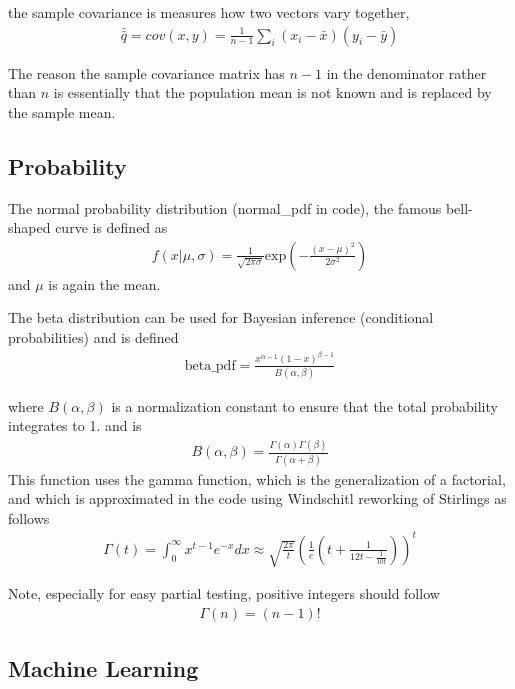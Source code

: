 \documentclass[jcp,aip,amsmath]{revtex4-1}
\begin{document}
the sample covariance is measures how two vectors vary together,
\begin{align}
\bar{\bar{q}}= cov(x,y) = \frac{1}{n-1} \sum_i (x_i - \bar{x}) (y_i - \bar{y})
\end{align}

The reason the sample covariance matrix has $n-1$ in the denominator rather than $n$ is essentially that the population mean is not known and is replaced by the sample mean.




\subsection{Probability}
 The normal probability distribution (normal\_pdf in code), the famous bell-shaped curve is
defined as
\begin{align}
f(x|\mu,\sigma) = \frac{1}{\sqrt{2\pi\sigma}}\mathrm{exp}\left(-\frac{(x-\mu)^2}{2\sigma^2}\right)
\end{align}
and $\mu$ is again the mean.

The beta distribution can be used for Bayesian inference (conditional probabilities) and is defined
\begin{align}
\mathrm{beta\_pdf} = \frac{x^{\alpha-1}(1-x)^{\beta-1}}{B(\alpha,\beta)}
\end{align}

where $B(\alpha,\beta)$ is a normalization constant to ensure that the total probability integrates to 1.
and is
\begin{align}
B(\alpha,\beta) = \frac{\Gamma(\alpha) \Gamma(\beta) }{\Gamma(\alpha + \beta)}
\end{align}
This function uses the gamma function, which is the generalization of a factorial, and which is approximated in the code using Windschitl reworking of Stirlings as follows
\begin{align}
\Gamma(t) = \int_0^{\infty} x^{t-1} e^{-x} dx \approx  \sqrt{\frac{2\pi}{t}}\left(\frac{1}{e}\left(t + \frac{1}{12t -\frac{1}{10t}}\right)\right)^t
\end{align}

Note, especially for easy partial testing, positive integers should follow
\begin{align}
\Gamma(n)=(n-1)!
\end{align}


\subsection{Machine Learning}
\end{document}
